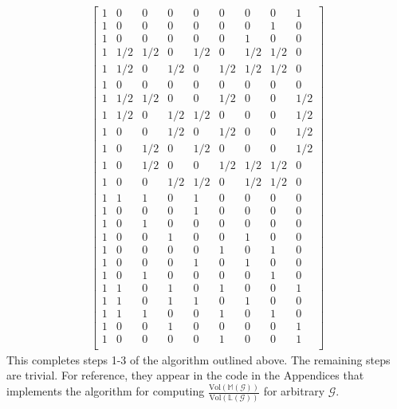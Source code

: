 \begin{equation}\label{eq:vrepfromhrep}
\begin{aligned}
\begin{bmatrix}
  1 & 0 & 0 & 0 & 0 & 0 & 0 & 0 & 1\\
  1 & 0 & 0 & 0 & 0 & 0 & 0 & 1 & 0\\
  1 & 0 & 0 & 0 & 0 & 0 & 1 & 0 & 0\\
  1 & 1/2 & 1/2 & 0 & 1/2 & 0 & 1/2 & 1/2 & 0\\
  1 & 1/2 & 0 & 1/2 & 0 & 1/2 & 1/2 & 1/2 & 0\\
  1 & 0 & 0 & 0 & 0 & 0 & 0 & 0 & 0\\
  1 & 1/2 & 1/2 & 0 & 0 & 1/2 & 0 & 0 & 1/2\\
  1 & 1/2 & 0 & 1/2 & 1/2 & 0 & 0 & 0 & 1/2\\
  1 & 0 & 0 & 1/2 & 0 & 1/2 & 0 & 0 & 1/2\\
  1 & 0 & 1/2 & 0 & 1/2 & 0 & 0 & 0 & 1/2\\
  1 & 0 & 1/2 & 0 & 0 & 1/2 & 1/2 & 1/2 & 0\\
  1 & 0 & 0 & 1/2 & 1/2 & 0 & 1/2 & 1/2 & 0\\
  1 & 1 & 1 & 0 & 1 & 0 & 0 & 0 & 0\\
  1 & 0 & 0 & 0 & 1 & 0 & 0 & 0 & 0\\
  1 & 0 & 1 & 0 & 0 & 0 & 0 & 0 & 0\\
  1 & 0 & 0 & 1 & 0 & 0 & 1 & 0 & 0\\
  1 & 0 & 0 & 0 & 0 & 1 & 0 & 1 & 0\\
  1 & 0 & 0 & 0 & 1 & 0 & 1 & 0 & 0\\
  1 & 0 & 1 & 0 & 0 & 0 & 0 & 1 & 0\\
  1 & 1 & 0 & 1 & 0 & 1 & 0 & 0 & 1\\
  1 & 1 & 0 & 1 & 1 & 0 & 1 & 0 & 0\\
  1 & 1 & 1 & 0 & 0 & 1 & 0 & 1 & 0\\
  1 & 0 & 0 & 1 & 0 & 0 & 0 & 0 & 1\\
  1 & 0 & 0 & 0 & 0 & 1 & 0 & 0 & 1\\
\end{bmatrix}
\end{aligned}
\end{equation}
This completes steps 1-3 of the algorithm outlined above. The remaining steps are trivial. For reference, they appear in the code in the Appendices that implements the algorithm for computing $\frac{\text{Vol}(\mathbb{M}(\mathcal{G}))}{\text{Vol}(\mathbb{L}(\mathcal{G}))}$ for arbitrary $\mathcal{G}$.

